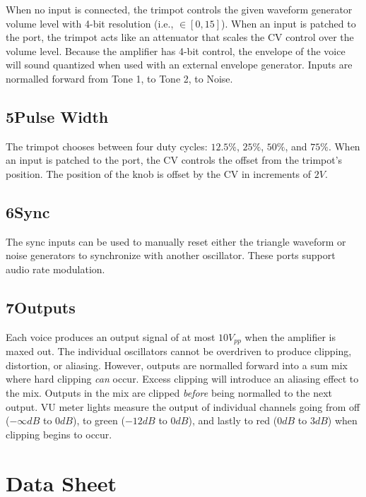 \documentclass[12pt,letter]{article}
\begin{document}
When no input is connected, the trimpot controls the given waveform generator volume level with 4-bit resolution (i.e., $\in [0, 15]$). When an input is patched to the port, the trimpot acts like an attenuator that scales the CV control over the volume level. Because the amplifier has 4-bit control, the envelope of the voice will sound quantized when used with an external envelope generator. Inputs are normalled forward from Tone 1, to Tone 2, to Noise.

\subsection*{5{\quad}Pulse Width}

The trimpot chooses between four duty cycles: $12.5\%$, $25\%$, $50\%$, and $75\%$. When an input is patched to the port, the CV controls the offset from the trimpot's position. The position of the knob is offset by the CV in increments of $2V$.

\subsection*{6{\quad}Sync}

The sync inputs can be used to manually reset either the triangle waveform or noise generators to synchronize with another oscillator. These ports support audio rate modulation.

\subsection*{7{\quad}Outputs}

Each voice produces an output signal of at most $10V_{pp}$ when the amplifier is maxed out. The individual oscillators cannot be overdriven to produce clipping, distortion, or aliasing. However, outputs are normalled forward into a sum mix where hard clipping \textit{can} occur. Excess clipping will introduce an aliasing effect to the mix. Outputs in the mix are clipped \textit{before} being normalled to the next output. VU meter lights measure the output of individual channels going from off ($-\infty dB$ to $0dB$), to green ($-12dB$ to $0dB$), and lastly to red ($0dB$ to $3dB$) when clipping begins to occur.


\clearpage
\section*{Data Sheet}
\end{document}
